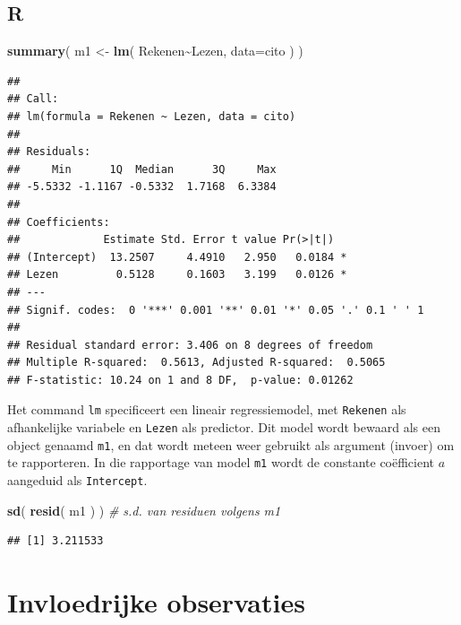 \documentclass[
]{book}
\newenvironment{Shaded}{\begin{snugshade}}{\end{snugshade}}
\newcommand{\CommentTok}[1]{\textcolor[rgb]{0.56,0.35,0.01}{\textit{#1}}}
\newcommand{\DataTypeTok}[1]{\textcolor[rgb]{0.13,0.29,0.53}{#1}}
\newcommand{\KeywordTok}[1]{\textcolor[rgb]{0.13,0.29,0.53}{\textbf{#1}}}
\newcommand{\NormalTok}[1]{#1}
\newcommand{\OperatorTok}[1]{\textcolor[rgb]{0.81,0.36,0.00}{\textbf{#1}}}
\newcommand{\StringTok}[1]{\textcolor[rgb]{0.31,0.60,0.02}{#1}}
\begin{document}
\hypertarget{r-7}{%
\subsection{R}\label{r-7}}

\begin{Shaded}
\begin{Highlighting}[]
\KeywordTok{summary}\NormalTok{( m1 \textless{}{-}}\StringTok{ }\KeywordTok{lm}\NormalTok{( Rekenen}\OperatorTok{\textasciitilde{}}\NormalTok{Lezen, }\DataTypeTok{data=}\NormalTok{cito ) )}
\end{Highlighting}
\end{Shaded}

\begin{verbatim}
## 
## Call:
## lm(formula = Rekenen ~ Lezen, data = cito)
## 
## Residuals:
##     Min      1Q  Median      3Q     Max 
## -5.5332 -1.1167 -0.5332  1.7168  6.3384 
## 
## Coefficients:
##             Estimate Std. Error t value Pr(>|t|)  
## (Intercept)  13.2507     4.4910   2.950   0.0184 *
## Lezen         0.5128     0.1603   3.199   0.0126 *
## ---
## Signif. codes:  0 '***' 0.001 '**' 0.01 '*' 0.05 '.' 0.1 ' ' 1
## 
## Residual standard error: 3.406 on 8 degrees of freedom
## Multiple R-squared:  0.5613, Adjusted R-squared:  0.5065 
## F-statistic: 10.24 on 1 and 8 DF,  p-value: 0.01262
\end{verbatim}

Het command \texttt{lm} specificeert een lineair regressiemodel, met \texttt{Rekenen}
als afhankelijke variabele en \texttt{Lezen} als predictor. Dit model wordt
bewaard als een object genaamd \texttt{m1}, en dat wordt meteen weer gebruikt
als argument (invoer) om te rapporteren. In die rapportage van model
\texttt{m1} wordt de constante coëfficient \(a\) aangeduid als \texttt{Intercept}.

\begin{Shaded}
\begin{Highlighting}[]
\KeywordTok{sd}\NormalTok{( }\KeywordTok{resid}\NormalTok{( m1 ) ) }\CommentTok{\# s.d. van residuen volgens \textasciigrave{}m1\textasciigrave{}}
\end{Highlighting}
\end{Shaded}

\begin{verbatim}
## [1] 3.211533
\end{verbatim}

\hypertarget{invloedrijke-observaties}{%
\section{Invloedrijke observaties}\label{invloedrijke-observaties}}
\end{document}
